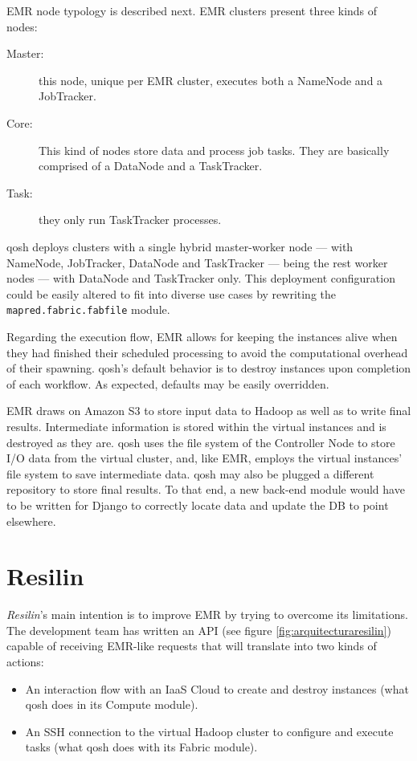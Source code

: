 EMR node typology is described next. EMR clusters present three kinds of nodes:

\begin{description}
    \item[Master:] this node, unique per EMR cluster, executes both a NameNode and a JobTracker.
    \item[Core:] This kind of nodes store data and process job tasks. They are basically comprised of a DataNode and a TaskTracker.
    \item[Task:] they only run TaskTracker processes.
\end{description}

qosh deploys clusters with a single hybrid master-worker node --- with NameNode, JobTracker, DataNode and TaskTracker --- being the rest worker nodes --- with DataNode and TaskTracker only. This deployment configuration could be easily altered to fit into diverse use cases by rewriting the \texttt{mapred.fabric.fabfile} module.

Regarding the execution flow, EMR allows for keeping the instances alive when they had finished their scheduled processing to avoid the computational overhead of their spawning. qosh's default behavior is to destroy instances upon completion of each workflow. As expected, defaults may be easily overridden.

EMR draws on Amazon S3 to store input data to Hadoop as well as to write final results. Intermediate information is stored within the virtual instances and is destroyed as they are. qosh uses the file system of the Controller Node to store I/O data from the virtual cluster, and, like EMR, employs the virtual instances' file system to save intermediate data. qosh may also be plugged a different repository to store final results. To that end, a new back-end module would have to be written for Django to correctly locate data and update the DB to point elsewhere.

\section{Resilin}\label{sec:resilin}
\noindent \emph{Resilin}'s \cite{resilin} main intention is to improve EMR by trying to overcome its limitations. The development team has written an API (see figure \ref{fig:arquitecturaresilin}) capable of receiving EMR-like requests that will translate into two kinds of actions:

\begin{itemize}
    \item An interaction flow with an IaaS Cloud to create and destroy instances (what qosh does in its Compute module).
    \item An SSH connection to the virtual Hadoop cluster to configure and execute tasks (what qosh does with its Fabric module).
\end{itemize}

